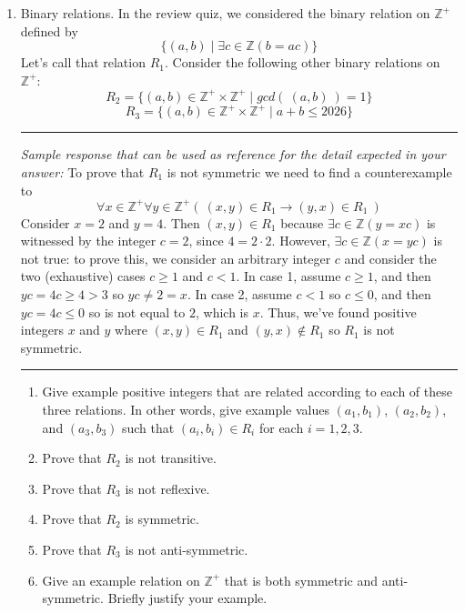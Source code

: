 \begin{enumerate}[labelindent=0pt, leftmargin=0pt]
    \item Binary relations. In the review quiz, we considered the binary relation on 
    $\mathbb{Z}^+$ defined by 
    \[\{(a,b) \mid \exists c \in \mathbb{Z}(b = ac)\}
    \]
    Let's call that relation $R_1$.
    Consider the following other binary relations on $\mathbb{Z}^{+}$:
    \[
    R_2 = \{ (a,b) \in \mathbb{Z}^+ \times \mathbb{Z}^+ \mid gcd (~ (a,b) ~) = 1\}    
    \]
    \[
    R_3 = \{ (a,b) \in \mathbb{Z}^+ \times \mathbb{Z}^+ \mid a+b \leq 2026\}    
    \]


    \rule{0.5\textwidth}{.4pt}
    
    {\it Sample response that can be used as reference for the detail expected 
    in your answer:} 
    To prove that $R_1$ is not symmetric we need to find a counterexample 
    to 
    \[
        \forall x \in \mathbb{Z}^+ \forall y \in \mathbb{Z}^+ \left(~(x,y) \in R_1 \to (y,x) \in R_1 ~\right)
    \]
    Consider $x = 2$ and $y=4$. Then $(x,y) \in R_1$ because $\exists c \in \mathbb{Z} ( y = xc )$ is witnessed
    by the integer $c = 2$, since $4 = 2 \cdot 2$. However, $\exists c  \in \mathbb{Z} ( x = yc )$ is not
    true: to prove this, we consider an arbitrary integer $c$ and consider the two 
    (exhaustive) cases $c \geq 1$ and $c < 1$. 
    In case 1,
    assume $c \geq 1$, and then $yc = 4c \geq 4 > 3$ so $yc \neq 2 = x$. In case 2, assume $c < 1$ so $c \leq 0$,
    and then $yc = 4c \leq 0$ so is not equal to $2$, which is $x$. Thus, we've found positive integers 
    $x$ and $y$ where $(x,y) \in R_1$ and $(y,x) \notin R_1$ so $R_1$ is not symmetric.

    \rule{0.5\textwidth}{.4pt}
    


    \begin{enumerate}
        \item Give example positive integers that are related
        according to each of these three relations. In other words, give 
        example values $(a_1, b_1)$, $(a_2, b_2)$, and $(a_3, b_3)$ such that
        $(a_i, b_i) \in R_i$ for each $i =1,2,3$.
        \item Prove that $R_2$ is not transitive.
        \item Prove that $R_3$ is not reflexive.
        \item Prove that $R_2$ is symmetric. 
        \item Prove that $R_3$ is not anti-symmetric.
        \item Give an example relation on $\mathbb{Z}^+$ that is both symmetric and anti-symmetric.
        Briefly justify your example.
        \end{enumerate}
    


\end{enumerate}
